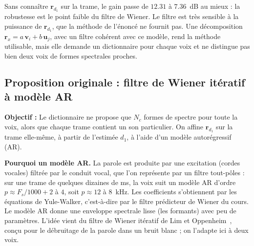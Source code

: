 \begin{resultat}[Conclusion]
Sans connaître $\mathbf{r}_{d_1}$ sur la trame, le gain passe de $12.31$ à $7.36$~dB au mieux : la robustesse est le point faible du filtre de Wiener. Le filtre est très sensible à la puissance de $\mathbf{r}_{d_1}$, que la méthode de l'énoncé ne fournit pas. Une décomposition $\mathbf{r}_x=a\,\mathbf{v}_i+b\,\mathbf{u}_j$, avec un filtre cohérent avec ce modèle, rend la méthode utilisable, mais elle demande un dictionnaire pour chaque voix et ne distingue pas bien deux voix de formes spectrales proches.
\end{resultat}

\subsection{Proposition originale : filtre de Wiener itératif à modèle AR}

\begin{enonce}
\textbf{Objectif :} Le dictionnaire ne propose que $N_c$ formes de spectre pour toute la voix, alors que chaque trame contient un son particulier. On affine $\mathbf{r}_{d_1}$ sur la trame elle-même, à partir de l'estimée $\hat d_1$, à l'aide d'un modèle autorégressif (AR).
\end{enonce}

\textbf{Pourquoi un modèle AR.} La parole est produite par une excitation (cordes vocales) filtrée par le conduit vocal, que l'on représente par un filtre tout-pôles : sur une trame de quelques dizaines de ms, la voix suit un modèle AR d'ordre $p\approx F_s/1000+2$ à $4$, soit $p\approx 12$ à $8$~kHz. Les coefficients s'obtiennent par les équations de Yule-Walker, c'est-à-dire par le filtre prédicteur de Wiener du cours. Le modèle AR donne une enveloppe spectrale lisse (les formants) avec peu de paramètres. L'idée vient du filtre de Wiener itératif de Lim et Oppenheim~\cite{lim1978}, conçu pour le débruitage de la parole dans un bruit blanc ; on l'adapte ici à deux voix.

